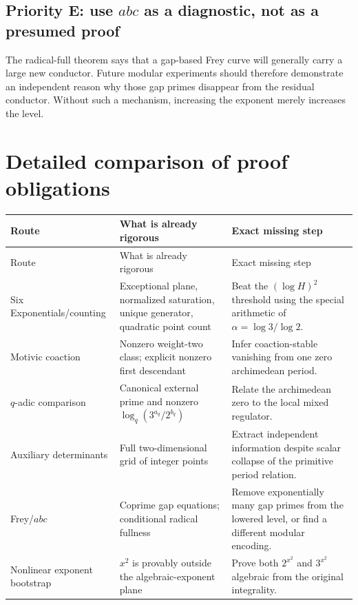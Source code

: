 \documentclass[11pt,oneside]{article}
\theoremstyle{definition}
\begin{document}
\subsection{Priority E: use $abc$ as a diagnostic, not as a presumed proof}

The radical-full theorem says that a gap-based Frey curve will generally carry a large new conductor.  Future modular experiments should therefore demonstrate an independent reason why those gap primes disappear from the residual conductor.  Without such a mechanism, increasing the exponent merely increases the level.

\section{Detailed comparison of proof obligations}

\begin{longtable}{>{\raggedright\arraybackslash}p{} >{\raggedright\arraybackslash}p{} >{\raggedright\arraybackslash}p{}}
\toprule
Route & What is already rigorous & Exact missing step\\
\midrule
\endfirsthead
\toprule
Route & What is already rigorous & Exact missing step\\
\midrule
\endhead
Six Exponentials/counting & Exceptional plane, normalized saturation, unique generator, quadratic point count & Beat the $(\log H)^2$ threshold using the special arithmetic of $\alpha=\log3/\log2$.\\
\addlinespace
Motivic coaction & Nonzero weight-two class; explicit nonzero first descendant & Infer coaction-stable vanishing from one zero archimedean period.\\
\addlinespace
$q$-adic comparison & Canonical external prime and nonzero $\log_q(3^{a_q}/2^{b_q})$ & Relate the archimedean zero to the local mixed regulator.\\
\addlinespace
Auxiliary determinants & Full two-dimensional grid of integer points & Extract independent information despite scalar collapse of the primitive period relation.\\
\addlinespace
Frey/$abc$ & Coprime gap equations; conditional radical fullness & Remove exponentially many gap primes from the lowered level, or find a different modular encoding.\\
\addlinespace
Nonlinear exponent bootstrap & $x^2$ is provably outside the algebraic-exponent plane & Prove both $2^{x^2}$ and $3^{x^2}$ algebraic from the original integrality.\\
\bottomrule
\end{longtable}
\end{document}
